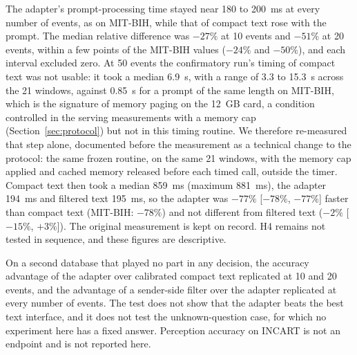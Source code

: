  The adapter's prompt-processing time stayed near 180 to 200~ms at every number of events, as on MIT-BIH, while that of compact text rose with the prompt. The median relative difference was $-27\%$ at 10 events and $-51\%$ at 20 events, within a few points of the MIT-BIH values ($-24\%$ and $-50\%$), and each interval excluded zero. At 50 events the confirmatory run's timing of compact text was not usable: it took a median 6.9~s, with a range of 3.3 to 15.3~s across the 21 windows, against 0.85~s for a prompt of the same length on MIT-BIH, which is the signature of memory paging on the 12~GB card, a condition controlled in the serving measurements with a memory cap (Section~\ref{sec:protocol}) but not in this timing routine. We therefore re-measured that step alone, documented before the measurement as a technical change to the protocol: the same frozen routine, on the same 21 windows, with the memory cap applied and cached memory released before each timed call, outside the timer. Compact text then took a median 859~ms (maximum 881~ms), the adapter 194~ms and filtered text 195~ms, so the adapter was $-77\%$ [$-78\%$, $-77\%$] faster than compact text (MIT-BIH: $-78\%$) and not different from filtered text ($-2\%$ [$-15\%$, $+3\%$]). The original measurement is kept on record. H4 remains not tested in sequence, and these figures are descriptive.

 On a second database that played no part in any decision, the accuracy advantage of the adapter over calibrated compact text replicated at 10 and 20 events, and the advantage of a sender-side filter over the adapter replicated at every number of events. The test does not show that the adapter beats the best text interface, and it does not test the unknown-question case, for which no experiment here has a fixed answer. Perception accuracy on INCART is not an endpoint and is not reported here.
